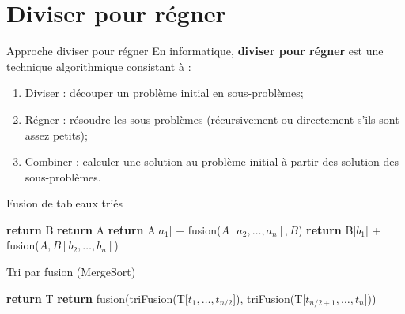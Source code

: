 \documentclass[10pt,xcolor=dvipsnames]{beamer}
\begin{document}
\section{Diviser pour régner}
\begin{frame}{Approche diviser pour régner}
En informatique, \textbf{\alert{diviser pour régner}} est une technique algorithmique consistant à : 
  \begin{enumerate}
  \item \alert{Diviser} : découper un problème initial en sous-problèmes;
  \item \alert{Régner} : résoudre les sous-problèmes (récursivement ou directement s'ils sont assez petits);
  \item \alert{Combiner} : calculer une solution au problème initial à partir des solution des sous-problèmes.
  \end{enumerate}
  

  \end{frame}
 
 
 \begin{frame}{Fusion de tableaux triés}
            \begin{tcolorbox}
  \begin{algorithmic}[1]
            \State \textbf{return} B
        \EndIf
            \State \textbf{return} A
        \EndIf
            \State \textbf{return} A[$a_1$] + fusion($A[a_2,\ldots,a_n],B$)
        \Else
            \State \textbf{return} B[$b_1$] + fusion($A, B[b_2,\ldots,b_n]$)   
        \EndIf
    \EndFunction
  \end{algorithmic}
\end{tcolorbox}


     
 \end{frame}

\begin{frame}{Tri par fusion (MergeSort)}
                \begin{tcolorbox}
  \begin{algorithmic}[1]
            \State \textbf{return} T
        \Else
            \State \textbf{return} fusion(triFusion(T[$t_1, \ldots, t_{n/2}$]), triFusion(T[$t_{n/2 + 1}, \ldots, t_n$]))
        \EndIf
    \EndFunction
  \end{algorithmic}
\end{tcolorbox}

\end{frame}
\end{document}
